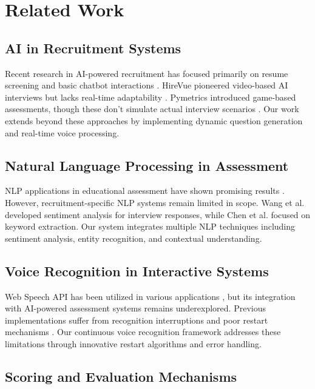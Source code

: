 \documentclass[conference]{IEEEtran}
\begin{document}
\section{Related Work}

\subsection{AI in Recruitment Systems}

Recent research in AI-powered recruitment has focused primarily on resume screening and basic chatbot interactions \cite{kumar2023ai}. HireVue pioneered video-based AI interviews but lacks real-time adaptability \cite{hirevue2023}. Pymetrics introduced game-based assessments, though these don't simulate actual interview scenarios \cite{pymetrics2023}. Our work extends beyond these approaches by implementing dynamic question generation and real-time voice processing.

\subsection{Natural Language Processing in Assessment}

NLP applications in educational assessment have shown promising results \cite{zhang2023nlp}. However, recruitment-specific NLP systems remain limited in scope. Wang et al. \cite{wang2023sentiment} developed sentiment analysis for interview responses, while Chen et al. \cite{chen2023keyword} focused on keyword extraction. Our system integrates multiple NLP techniques including sentiment analysis, entity recognition, and contextual understanding.

\subsection{Voice Recognition in Interactive Systems}

Web Speech API has been utilized in various applications \cite{w3c2023}, but its integration with AI-powered assessment systems remains underexplored. Previous implementations suffer from recognition interruptions and poor restart mechanisms \cite{anderson2023voice}. Our continuous voice recognition framework addresses these limitations through innovative restart algorithms and error handling.

\subsection{Scoring and Evaluation Mechanisms}
\end{document}

